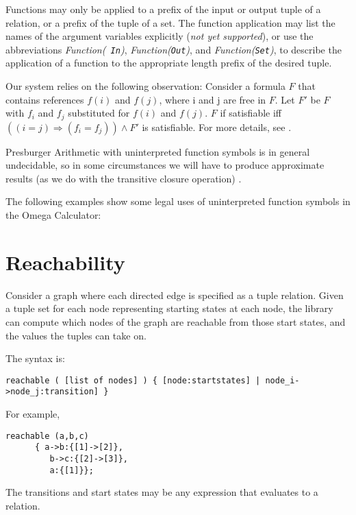 Functions may only be applied to a prefix of the input or output tuple
of a relation, or a prefix of the tuple of a set.  The function
application may list the names of the argument variables explicitly
({\em not yet supported}), or use the abbreviations {\em Function({\tt
In})}, {\em Function({\tt Out})}, and {\em Function({\tt Set})}, to
describe the application of a function to the appropriate length
prefix of the desired tuple.

Our system relies on the following observation: Consider a formula $F$
that contains references $f(i)$ and $f(j)$, where i and j are free in
$F$.  Let $F'$ be $F$ with $f_{i}$ and $f_{j}$ substituted for $f(i)$
and $f(j)$.  $F$ if satisfiable iff $((i = j) \Rightarrow (f_{i} =
f_{j})) \land F'$ is satisfiable.  For more details, see \cite{Shostak79}.

Presburger Arithmetic with uninterpreted function symbols is in
general undecidable, so in some circumstances we will have to produce
approximate results (as we do with the transitive closure operation)
\cite{transitiveClosure}. 

The following examples show some legal uses of uninterpreted function
symbols in the Omega Calculator:




\section{Reachability}

Consider a graph where each directed edge is specified as a tuple
relation.  Given a tuple set for each node representing starting
states at each node, the library can compute which nodes of the graph are
reachable from those start states, and the values the tuples can take
on.  

The syntax is:
\begin{verbatim}
reachable ( [list of nodes] ) { [node:startstates] | node_i->node_j:transition] }
\end{verbatim}

For example,

\begin{verbatim}
reachable (a,b,c)
	  { a->b:{[1]->[2]},
	     b->c:{[2]->[3]},
	     a:{[1]}};
\end{verbatim}

The transitions and start states may be any expression that evaluates
to a relation.

